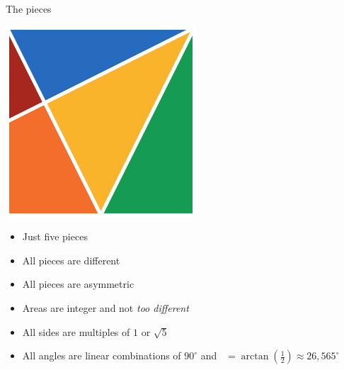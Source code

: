 \documentclass[14pt]{beamer}
\begin{document}

    \begin{frame}{The pieces}
        \begin{center}

            \begin{minipage}{17.5ex}\vspace{2ex}
                \includegraphics[height=17ex]{figures/figure001a.pdf}\\
            \end{minipage}\begin{minipage}{30ex}
                \footnotesize
                \begin{itemize}
                    \item Just five pieces
                    \item All pieces are different
                    \item All pieces are asymmetric
                    \item Areas are integer and not \emph{too different}
                    \item All sides are multiples of $1$ or $\sqrt{5}$
                    \item All angles are linear combinations of $90^\circ$ and \textalpha\ $= \arctan{\!\left(\tfrac{1}{2}\right)} \approx 26,565^\circ$
                \end{itemize}
            \end{minipage}

            \smallskip
            

\end{center}
\end{frame}
\end{document}
